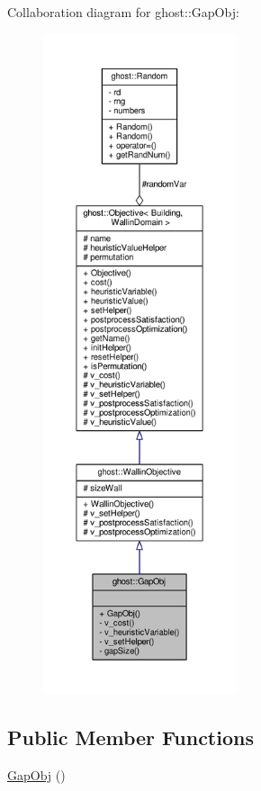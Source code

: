 Collaboration diagram for ghost\-:\-:Gap\-Obj\-:\nopagebreak
\begin{figure}[H]
\begin{center}
\leavevmode
\includegraphics[height=550pt]{classghost_1_1GapObj__coll__graph}
\end{center}
\end{figure}
\subsection*{Public Member Functions}
\begin{DoxyCompactItemize}
\item 
\hyperlink{classghost_1_1GapObj_a9b1139edad4eb82edab5e135e1257f72}{Gap\-Obj} ()
\end{DoxyCompactItemize}

